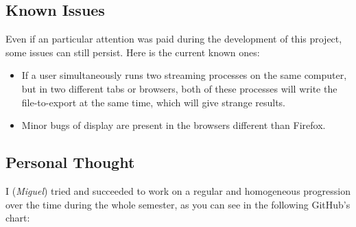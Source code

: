 \documentclass[a4paper,11pt]{report}
\begin{document}
\subsection{Known Issues}
Even if an particular attention was paid during the development of this project, some issues can still persist. Here is the current known ones:
\begin{itemize}
	\item If a user simultaneously runs two streaming processes on the same computer, but in two different tabs or browsers, both of these processes will write the file-to-export at the same time, which will give strange results.
	\item Minor bugs of display are present in the browsers different than Firefox.
\end{itemize}

\subsection{Personal Thought}
I (\emph{Miguel}) tried and succeeded to work on a regular and homogeneous progression over the time during the whole semester, as you can see in the following GitHub's chart:
\end{document}
